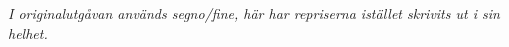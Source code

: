 \textit{I originalutgåvan används segno/fine, här har repriserna istället skrivits ut i sin helhet.}